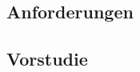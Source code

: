 \def \sectionauthors {Dennis Köb}
\subsection{Anforderungen}
\lipsum[1-5]
\subsection{Vorstudie}
\lipsum[1-5]